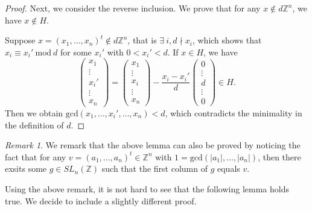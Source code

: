 \documentclass[12pt]{amsart}
\theoremstyle{definition}
\theoremstyle{remark}
\newtheorem{remark}[theorem]{Remark}
\begin{document}
\begin{proof}
Next, we consider the reverse inclusion. We prove that for any $x\not\in d\mathbb{Z}^n$, we have $x\not\in H$.

Suppose $x=(x_1,\dots,x_n)^t\not\in d\mathbb{Z}^n$, that is $\exists~ i, d\nmid x_i$, which shows that $x_i\equiv x_i'~\text{mod}~d$ for some $x_i'$ with $0<x_i'<d$. If $x\in H$, we have \begin{equation*}
    \left(\begin{smallmatrix}
        x_1\\
        \vdots\\
        x_i'\\
        \vdots\\
        x_n 
\end{smallmatrix}\right)=\left(\begin{smallmatrix}
         x_1\\
        \vdots\\
        x_i\\
        \vdots\\
        x_n 
    \end{smallmatrix}\right)-\frac{x_i-x_i'}{d}\left(\begin{smallmatrix}
         0\\
        \vdots\\
        d\\
        \vdots\\
        0
    \end{smallmatrix}\right)\in H.
\end{equation*}
Then we obtain $\text{gcd}(x_1,\dots,x_i',\dots,x_n)<d$, which contradicts the minimality in the definition of $d$.
\end{proof}

\begin{remark}
    We remark that the above lemma can also be proved by noticing the fact that for any $v=(a_1,\ldots, a_n)^t\in \mathbb{Z}^n$ with $1=\text{gcd}(\left|a_1\right|,\ldots, \left|a_n\right|)$, then there exsits some $g\in SL_n(\mathbb{Z})$ such that the first column of $g$ equals $v$.
\end{remark}

Using the above remark, it is not hard to see that the following lemma holds true. We decide to include a slightly different proof.
\end{document}
